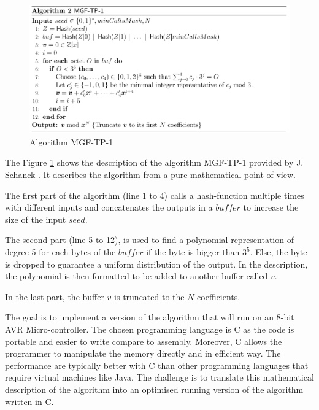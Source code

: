 \begin{figure}[h]
  \includegraphics[width=\textwidth]{img/mgf1-description.png}
  \caption{Algorithm MGF-TP-1 \cite{schanck_practical_2015} }
  \label{fig:mgf-1}
\end{figure}

The Figure \ref{fig:mgf-1} shows the description of the algorithm MGF-TP-1 provided by J. Schanck \cite{schanck_practical_2015}. It describes the algorithm from a pure mathematical point of view. 

The first part of the algorithm (line 1 to 4) calls a hash-function multiple times with different inputs and concatenates the outputs in a $buffer$ to increase the size of the input $seed$.

The second part (line 5 to 12), is used to find a polynomial representation of degree 5 for each bytes of the $buffer$ if the byte is bigger than $3^5$. Else, the byte is dropped to guarantee a uniform distribution of the output. In the description, the polynomial is then formatted to be added to another buffer called $v$.

In the last part, the buffer $v$ is truncated to the $N$ coefficients.

The goal is to implement a version of the algorithm that will run on an 8-bit AVR Micro-controller. The chosen programming language is C as the code is portable and easier to write compare to assembly. Moreover, C allows the programmer to manipulate the memory directly and in efficient way. The performance are typically better with C than other programming languages that require virtual machines like Java. 
The challenge is to translate this mathematical description of the algorithm into an optimised running version of the algorithm written in C.


